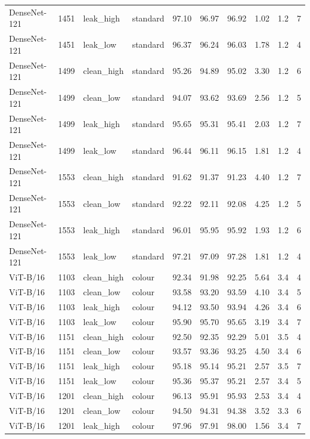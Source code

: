 {\begin{longtable}{lrllrrrrrr}
DenseNet-121 & 1451 & leak\_high & standard & 97.10 & 96.97 & 96.92 & 1.02 & 1.2 & 7 \\
DenseNet-121 & 1451 & leak\_low & standard & 96.37 & 96.24 & 96.03 & 1.78 & 1.2 & 4 \\
DenseNet-121 & 1499 & clean\_high & standard & 95.26 & 94.89 & 95.02 & 3.30 & 1.2 & 6 \\
DenseNet-121 & 1499 & clean\_low & standard & 94.07 & 93.62 & 93.69 & 2.56 & 1.2 & 5 \\
DenseNet-121 & 1499 & leak\_high & standard & 95.65 & 95.31 & 95.41 & 2.03 & 1.2 & 7 \\
DenseNet-121 & 1499 & leak\_low & standard & 96.44 & 96.11 & 96.15 & 1.81 & 1.2 & 4 \\
DenseNet-121 & 1553 & clean\_high & standard & 91.62 & 91.37 & 91.23 & 4.40 & 1.2 & 7 \\
DenseNet-121 & 1553 & clean\_low & standard & 92.22 & 92.11 & 92.08 & 4.25 & 1.2 & 5 \\
DenseNet-121 & 1553 & leak\_high & standard & 96.01 & 95.95 & 95.92 & 1.93 & 1.2 & 6 \\
DenseNet-121 & 1553 & leak\_low & standard & 97.21 & 97.09 & 97.28 & 1.81 & 1.2 & 4 \\
ViT-B/16 & 1103 & clean\_high & colour & 92.34 & 91.98 & 92.25 & 5.64 & 3.4 & 4 \\
ViT-B/16 & 1103 & clean\_low & colour & 93.58 & 93.20 & 93.59 & 4.10 & 3.4 & 5 \\
ViT-B/16 & 1103 & leak\_high & colour & 94.12 & 93.50 & 93.94 & 4.26 & 3.4 & 6 \\
ViT-B/16 & 1103 & leak\_low & colour & 95.90 & 95.70 & 95.65 & 3.19 & 3.4 & 7 \\
ViT-B/16 & 1151 & clean\_high & colour & 92.50 & 92.35 & 92.29 & 5.01 & 3.5 & 4 \\
ViT-B/16 & 1151 & clean\_low & colour & 93.57 & 93.36 & 93.25 & 4.50 & 3.4 & 6 \\
ViT-B/16 & 1151 & leak\_high & colour & 95.18 & 95.14 & 95.21 & 2.57 & 3.5 & 7 \\
ViT-B/16 & 1151 & leak\_low & colour & 95.36 & 95.37 & 95.21 & 2.57 & 3.4 & 5 \\
ViT-B/16 & 1201 & clean\_high & colour & 96.13 & 95.91 & 95.93 & 2.53 & 3.4 & 4 \\
ViT-B/16 & 1201 & clean\_low & colour & 94.50 & 94.31 & 94.38 & 3.52 & 3.3 & 6 \\
ViT-B/16 & 1201 & leak\_high & colour & 97.96 & 97.91 & 98.00 & 1.56 & 3.4 & 7 \\

\end{longtable}}
